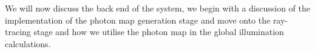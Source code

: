 We will now discuss the back end of the system, we begin with a discussion of the implementation of the photon map generation
stage and move onto the ray-tracing stage and how we utilise the photon map in the global illumination calculations.


\newpage


